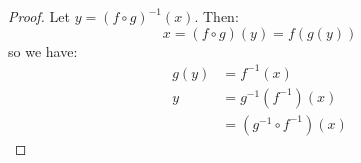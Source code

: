 \begin{itemize}
\begin{theorem}
        \begin{proof}
            Let $y=(f\circ g)^{-1}(x)$. Then:
            \begin{equation}
                x = (f\circ g)(y) = f(g(y))
                \label{eq:}
            \end{equation}
            so we have:
            \begin{align}
                g(y) &= f^{-1}(x) \\ 
                y &= g^{-1}(f^{-1})(x) \\ 
                &= (g^{-1} \circ f^{-1})(x)
            \end{align}
        \end{proof}
    \end{theorem}
\end{itemize}